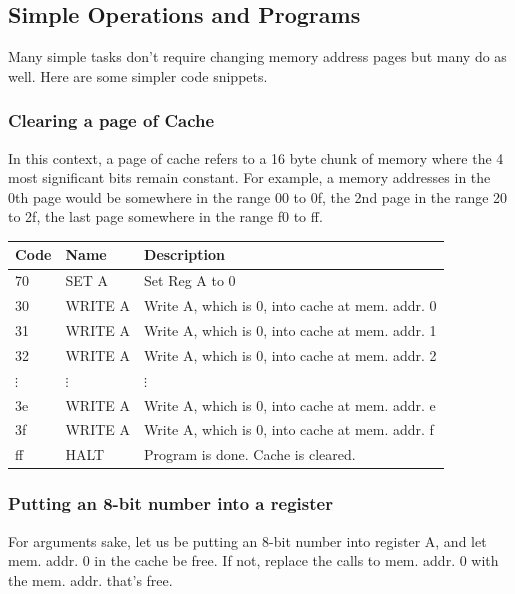 \documentclass[12pt]{report}
\begin{document}
	\subsection{Simple Operations and Programs}
	
	Many simple tasks don't require changing memory address pages but many do as well. Here are some simpler code snippets.
	
	\subsubsection{Clearing a page of Cache}
	
	In this context, a page of cache refers to a 16 byte chunk of memory where the 4 most significant bits remain constant. For example, a memory addresses in the 0th page would be somewhere in the range 00 to 0f, the 2nd page in the range 20 to 2f, the last page somewhere in the range f0 to ff.
	
	\FloatBarrier
	\begin{table}[!ht]
		\begin{tabular}{lll}
			Code 			& Name 				& Description \\ \hline
			70 				& SET A 			& Set Reg A to 0 \\
			30 				& WRITE A 			& Write A, which is 0, into cache at mem. addr. 0 \\
			31 				& WRITE A 			& Write A, which is 0, into cache at mem. addr. 1 \\
			32 				& WRITE A 			& Write A, which is 0, into cache at mem. addr. 2 \\
			$\vdots$		& $\vdots$			& $\vdots$ \\
			3e 				& WRITE A 			& Write A, which is 0, into cache at mem. addr. e \\
			3f	 			& WRITE A			& Write A, which is 0, into cache at mem. addr. f \\
			ff				& HALT				& Program is done. Cache is cleared. \\
		\end{tabular}
	\end{table}
	\FloatBarrier
	
	
	
	\subsubsection{Putting an 8-bit number into a register}
	
	For arguments sake, let us be putting an 8-bit number into register A, and let mem. addr. 0 in the cache be free. If not, replace the calls to mem. addr. 0 with the mem. addr. that's free.
	
\end{document}
